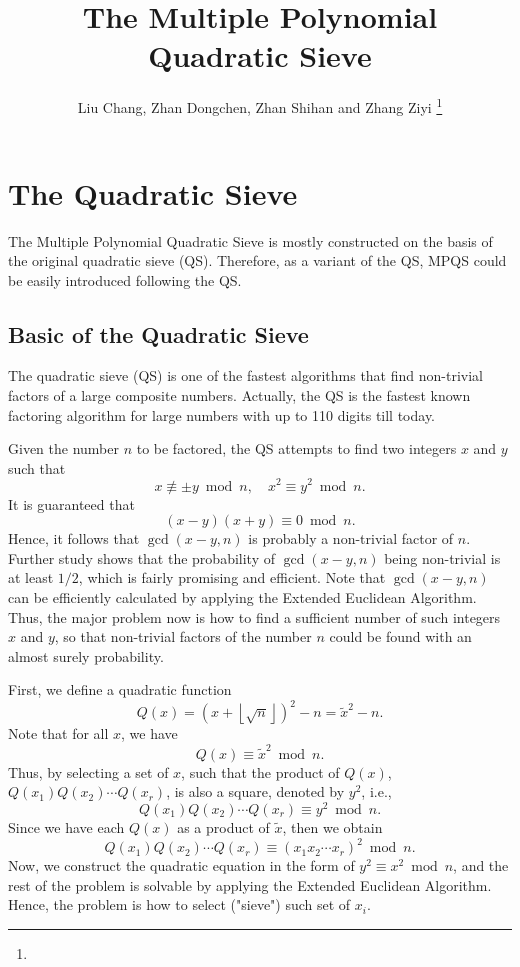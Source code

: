\documentclass[letterpaper, 10pt, conference]{ieeeconf}  %
\title{\LARGE \bf The Multiple Polynomial Quadratic Sieve}
\author{Liu Chang, Zhan Dongchen, Zhan Shihan and Zhang Ziyi%
\thanks{}%
}
\theoremstyle{definition}
\theoremstyle{property}
\begin{document}
\maketitle
\thispagestyle{empty}
\pagestyle{empty}

\section{The Quadratic Sieve}
The Multiple Polynomial Quadratic Sieve is mostly constructed on the basis of the original quadratic sieve (QS). Therefore, as a variant of the QS, MPQS could be easily introduced following the QS.
\subsection{Basic of the Quadratic Sieve}
The quadratic sieve (QS) is one of the fastest algorithms that find non-trivial factors of a large composite numbers. Actually, the QS is the fastest known factoring algorithm for large numbers with up to 110 digits till today.

Given the number $n$ to be factored, the QS attempts to find two integers $x$ and $y$ such that 
$$x\not\equiv\pm y\bmod n, \quad x^2\equiv y^2\bmod n.$$
It is guaranteed that 
$$(x-y)(x+y)\equiv 0\bmod n.$$
Hence, it follows that $\gcd(x-y,n)$ is probably a non-trivial factor of $n$. Further study shows that the probability of $\gcd(x-y,n)$ being non-trivial is at least $1/2$, which is fairly promising and efficient. Note that $\gcd(x-y,n)$ can be efficiently calculated by applying the Extended Euclidean Algorithm. Thus, the major problem now is how to find a sufficient number of such integers $x$ and $y$, so that non-trivial factors of the number $n$ could be found with an almost surely probability. 

First, we define a quadratic function
$$Q(x) = (x+\left\lfloor\sqrt{n}\right\rfloor)^2-n = \tilde{x}^2-n.$$
Note that for all $x$, we have
$$Q(x)\equiv \tilde{x}^2\bmod n.$$
Thus, by selecting a set of $x$, such that the product of $Q(x)$, $Q(x_1)Q(x_2)\cdots Q(x_r)$, is also a square, denoted by $y^2$, i.e.,
$$Q(x_1)Q(x_2)\cdots Q(x_r)\equiv y^2\bmod n.$$
Since we have each $Q(x)$ as a product of $\tilde{x}$, then we obtain 
$$Q(x_1)Q(x_2)\cdots Q(x_r)\equiv (x_1x_2\cdots x_r)^2\bmod n.$$
Now, we construct the quadratic equation in the form of $y^2\equiv x^2\bmod n$, and the rest of the problem is solvable by applying the Extended Euclidean Algorithm. Hence, the problem is how to select ("sieve") such set of $x_i$.
\end{document}
